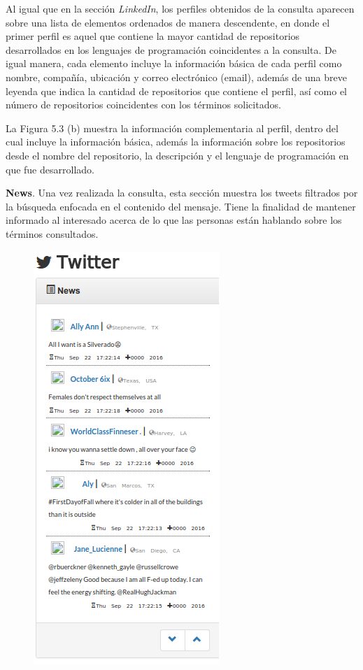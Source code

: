 Al igual que en la sección \textit{LinkedIn}, los perfiles obtenidos de la consulta aparecen sobre una lista de elementos ordenados de manera descendente, en donde el primer perfil es aquel que contiene la mayor cantidad de repositorios desarrollados en los lenguajes de programación coincidentes a la consulta. De igual manera, cada elemento incluye la información básica de cada perfil como nombre, compañía, ubicación y correo electrónico (email), además de una breve leyenda que indica la cantidad de repositorios que contiene el perfil, así como el número de repositorios coincidentes con los términos solicitados.

La Figura 5.3 (b) muestra la información complementaria al perfil, dentro del cual incluye la información básica, además la información sobre los repositorios desde el nombre del repositorio, la descripción y el lenguaje de programación en que fue desarrollado.


\textbf{News}.
Una vez realizada la consulta, esta sección muestra los tweets filtrados por la búsqueda enfocada en el contenido del mensaje. Tiene la finalidad de mantener informado al interesado acerca de lo que las personas están hablando sobre los términos consultados.

\begin{figure}[H]
	\centering
	\includegraphics[height=0.58\textheight]{fig01/secTwitter.png}
	\label{fig:RHP02}
\end{figure}

